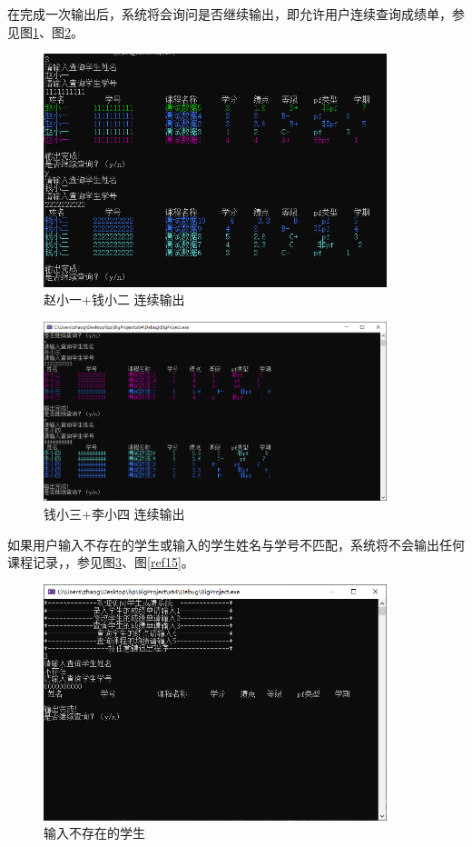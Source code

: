 \documentclass[fontset=windows]{article}
\begin{document}
在完成一次输出后，系统将会询问是否继续输出，即允许用户连续查询成绩单，参见图\ref{ref12}、图\ref{ref13}。
\newpage
\begin{figure}[h!]
	\begin{center}
		\includegraphics[width = 10cm]{case3 赵小一+钱小二 连续输出.png}
		\caption{赵小一+钱小二 连续输出}
		\label{ref12}
	\end{center}
\end{figure}

\begin{figure}[h!]
	\begin{center}
		\includegraphics[width = 10cm]{case3 钱小三+李小四.png}
		\caption{钱小三+李小四 连续输出}
		\label{ref13}
	\end{center}
\end{figure}

如果用户输入不存在的学生或输入的学生姓名与学号不匹配，系统将不会输出任何课程记录，，参见图\ref{ref14}、图\ref{ref15}。
\newpage
\begin{figure}[h!]
	\begin{center}
		\includegraphics[width = 10cm]{case3 不存在.png}
		\caption{输入不存在的学生}
		\label{ref14}
	\end{center}
\end{figure}
\end{document}
